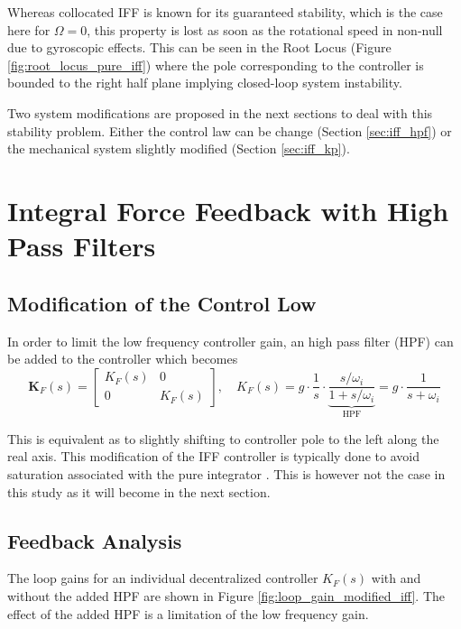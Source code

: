 \documentclass{ISMA_USD2020}
\begin{document}
Whereas collocated IFF is known for its guaranteed stability, which is the case here for \(\Omega = 0\), this property is lost as soon as the rotational speed in non-null due to gyroscopic effects.
This can be seen in the Root Locus (Figure \ref{fig:root_locus_pure_iff}) where the pole corresponding to the controller is bounded to the right half plane implying closed-loop system instability.

Two system modifications are proposed in the next sections to deal with this stability problem.
Either the control law can be change (Section \ref{sec:iff_hpf}) or the mechanical system slightly modified (Section \ref{sec:iff_kp}).

\section{Integral Force Feedback with High Pass Filters}
\label{sec:orgcdcaab1}
\label{sec:iff_hpf}
\subsection{Modification of the Control Low}
\label{sec:org9d35c60}
In order to limit the low frequency controller gain, an high pass filter (HPF) can be added to the controller which becomes
\begin{equation}
\label{eq:IFF_LHF}
  \bm{K}_F(s) = \begin{bmatrix} K_F(s) & 0 \\ 0 & K_F(s) \end{bmatrix}, \quad K_{F}(s) = g \cdot \frac{1}{s} \cdot \underbrace{\frac{s/\omega_i}{1 + s/\omega_i}}_{\text{HPF}} = g \cdot \frac{1}{s + \omega_i}
\end{equation}

This is equivalent as to slightly shifting to controller pole to the left along the real axis.
This modification of the IFF controller is typically done to avoid saturation associated with the pure integrator \cite{preumont91_activ}.
This is however not the case in this study as it will become in the next section.

\subsection{Feedback Analysis}
\label{sec:org54e6be5}
The loop gains for an individual decentralized controller \(K_F(s)\) with and without the added HPF are shown in Figure \ref{fig:loop_gain_modified_iff}.
The effect of the added HPF is a limitation of the low frequency gain.
\end{document}
